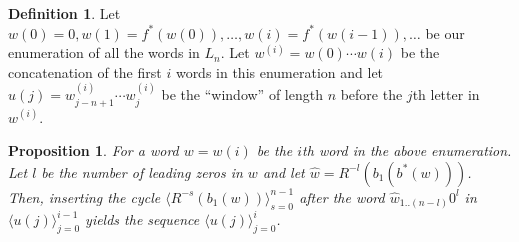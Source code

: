 \documentclass{article}
\newtheorem{proposition}[theorem]{Proposition}
\theoremstyle{definition}
\newtheorem{definition}{Definition}
\newcommand{\T}[1]{\langle{#1}\rangle}
\newcommand{\rl}[2]{R^{-{#2}}({#1})}
\begin{document}
\begin{definition}
	Let $w(0)=0, w(1)=f^*(w(0)),\dots,w(i)=f^*(w{(i-1)}),\dots$ be our enumeration of all the words in $L_n$. Let $w^{(i)}=w(0)\cdots w(i)$ be the concatenation of the first $i$ words in this enumeration and let $u(j)=w^{(i)}_{j-n+1}\cdots w^{(i)}_j$ be the ``window'' of length $n$ before the $j$th letter in $w^{(i)}$.
\end{definition}

\begin{proposition}
For a word $w=w(i)$ be the $i$th word in the above enumeration. Let $l$ be the number of leading zeros in $w$ and let $\hat{w}=\rl{b_1(b^*(w))}{l}$. Then, inserting the cycle $\T{\rl{b_1(w)}{s}}_{s=0}^{n-1}$ after the word $\hat{w}_{1..(n-l)}0^l$ in $\T{u(j)}_{j=0}^{i-1}$ yields the sequence $\T{u(j)}_{j=0}^{i}$.
\end{proposition}	
\end{document}
